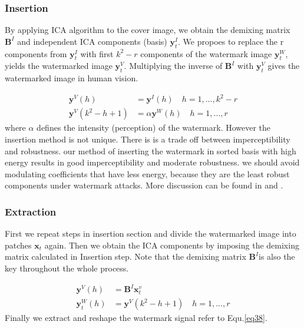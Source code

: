 \subsubsection{Insertion}
By applying ICA algorithm to the cover image, we obtain the demixing matrix $\mathbf{B}^I$ and independent ICA components (basis) $\mathbf{y}^I_t$. 
We propoes to replace the r components from $\mathbf{y}^I_t$ with first $k^2 -r$ components of the watermark image $\mathbf{y}^W_t$, yields the watermarked image  $\mathbf{y}^V_t$. Multiplying the inverse of $\mathbf{B}^I$ with $\mathbf{y}^V_t$ gives the watermarked image in human vision. 

\begin{align}
    \mathbf{y}^V(h) &=  \mathbf{y}^I(h) \quad h = 1,...,k^2-r \\
    \mathbf{y}^V(k^2-h+1) &= \alpha  \mathbf{y}^W(h) \quad h = 1,...,r
\end{align}
where $\alpha$ defines the intensity (perception) of the watermark. However the insertion method is not unique. 
There is is a trade off between imperceptibility and robustness. 
our method of inserting the watermark in sorted basis with high energy results in good imperceptibility and moderate robustness.
we should avoid modulating coefficients that have less energy, because they are the least robust components under watermark attacks. More discussion can be found in \cite{LuWei_ICA} and \cite{Yu2017}.

\subsubsection{Extraction}
First we repeat steps in insertion section and divide the watermarked image into patches $\mathbf{x}_t$ again. Then we obtain the ICA components by imposing the demixing matrix calculated in Insertion step. Note that the demixing matrix $\mathbf{B}^I$is also the key throughout the whole process.

\begin{align}
    \mathbf{y}^V(h)  &=  \mathbf{B}^I\mathbf{x}_t^v \\
    \mathbf{y}_t^W(h) &= \mathbf{y}^V(k^2-h+1) \quad h = 1,...,r
    \label{eq38}
\end{align}
Finally we extract and reshape the watermark signal refer to Equ.\ref{eq38}. 

